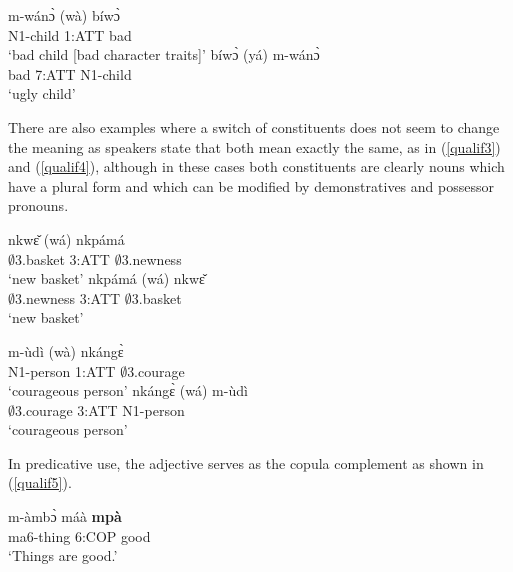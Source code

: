 \begin{exe}
\ex\label{qualif2}
\begin{xlist}
\ex\label{qualif2a}
 \gll  m-wánɔ̀ (wà) bíwɔ̀  \\
          N1-child 1:ATT bad  \\
    \trans `bad child [bad character traits]'
\ex \label{qualif2b}
  \gll   bíwɔ̀ (yá) m-wánɔ̀\\
          bad 7:ATT N1-child \\
    \trans `ugly child'
\end {xlist}
\end {exe}

There are also examples where a switch of constituents does not seem to change the meaning as speakers state that both mean exactly the same, as in (\ref{qualif3}) and (\ref{qualif4}), although in these cases both constituents are clearly nouns which have a plural form and which can be modified by demonstratives and possessor pronouns.

\begin{exe}
\ex\label{qualif3}
\begin{xlist}
\ex\label{qualif3a}
 \gll  nkwɛ̌ (wá) nkpámá  \\
          $\emptyset$3.basket 3:ATT $\emptyset$3.newness  \\
    \trans `new basket'
\ex \label{qualif3b}
  \gll   nkpámá (wá) nkwɛ̌\\
          $\emptyset$3.newness 3:ATT $\emptyset$3.basket \\
    \trans `new basket'
\end {xlist}
\end {exe}

\begin{exe}
\ex\label{qualif4}
\begin{xlist}
\ex\label{qualif4a}
 \gll  m-ùdì (wà) nkángɛ̀\\
          N1-person 1:ATT $\emptyset$3.courage  \\
    \trans `courageous person'
\ex \label{qualif4b}
  \gll   nkángɛ̀ (wá) m-ùdì\\
          $\emptyset$3.courage 3:ATT N1-person \\
    \trans `courageous person'
\end {xlist}
\end {exe}


In predicative use, the adjective serves as the copula complement as shown in (\ref{qualif5}). 

\begin{exe}
\ex\label{qualif5}
\gll m-àmbɔ̀ máà {\bfseries mpà} \\
	ma6-thing 6:COP good\\
    \trans `Things are good.'
\end {exe}


